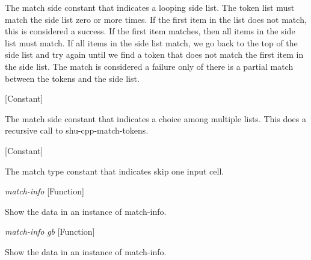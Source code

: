 \begin{doc-string}
The match side constant that indicates a looping side list.  The token list
must match the side list zero or more times.  If the first item in the list does
not match, this is considered a success.  If the first item matches, then all
items in the side list must match.  If all items in the side list match, we go
back to the top of the side list and try again until we find a token that does
not match the first item in the side list.  The match is considered a failure
only of there is a partial match between the tokens and the side list.
\end{doc-string}

\vspace{1em}
\noindent
{}
\usebox{\funcname}
 \hfill [Constant]

\begin{doc-string}
The match side constant that indicates a choice among multiple lists.
This does a recursive call to shu-cpp-match-tokens.
\end{doc-string}

\vspace{1em}
\noindent
{}
\usebox{\funcname}
 \hfill [Constant]

\begin{doc-string}
The match type constant that indicates skip one input cell.
\end{doc-string}

\vspace{1em}
\noindent
{}
\usebox{\funcname}\emph{match-info}
 \hfill [Function]

\begin{doc-string}
Show the data in an instance of match-info.
\end{doc-string}

\vspace{1em}
\noindent
{}
\usebox{\funcname}\emph{match-info} \emph{gb}
 \hfill [Function]

\begin{doc-string}
Show the data in an instance of match-info.
\end{doc-string}


